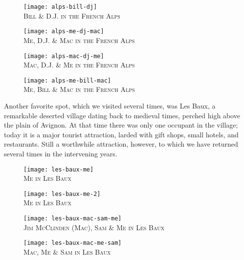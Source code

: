 \documentclass[../m3y]{subfiles}
\begin{document}
\begin{figure}[h]
\centering
\texttt{[image: alps-bill-dj]}\\
\medskip
{\newtimes\textsc{Bill \& D.J. in the French Alps}}
\end{figure}

\begin{figure}[h]
\centering
\texttt{[image: alps-me-dj-mac]}\\
\medskip
    {\newtimes\textsc{Me, D.J. \& Mac in the French Alps}}
\end{figure}

\begin{figure}[h]
\centering
\texttt{[image: alps-mac-dj-me]}\\
\medskip
{\newtimes\textsc{Mac, D.J. \& Me in the French Alps}}
\end{figure}

\begin{figure}[h]
\centering
\texttt{[image: alps-me-bill-mac]}\\
\medskip
{\newtimes\textsc{Me, Bill \& Mac in the French Alps}}
\end{figure}

Another favorite spot, which we visited several times, was Les Baux, a remarkable deserted village dating back to medieval times, perched high above the plain of Avignon.  At that time there was only one occupant in the village; today it is a major tourist attraction, larded with gift shops, small hotels, and restaurants. Still a worthwhile attraction, however, to which we have returned several times in the intervening years.

\begin{figure}[h]
\centering
\texttt{[image: les-baux-me]}\\
\medskip
{\newtimes\textsc{Me in Les Baux}}
\end{figure}

\begin{figure}[h]
\centering
\texttt{[image: les-baux-me-2]}\\
\medskip
{\newtimes\textsc{Me in Les Baux}}
\end{figure}

\begin{figure}[h]
\centering
\texttt{[image: les-baux-mac-sam-me]}\\
\medskip
{\newtimes\textsc{Jim McClinden (Mac), Sam \& Me in Les Baux}}
\end{figure}

\begin{figure}[h]
\centering
\texttt{[image: les-baux-mac-me-sam]}\\
\medskip
{\newtimes\textsc{Mac, Me \& Sam in Les Baux}}
\end{figure}
\end{document}
